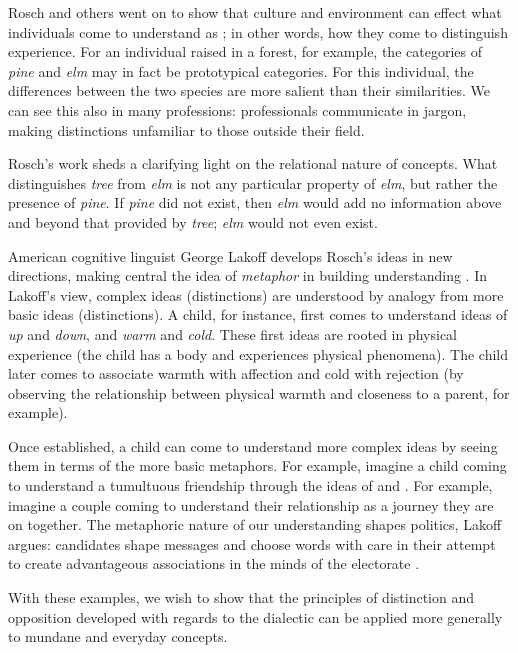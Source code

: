 \documentclass[12pt]{book}
\begin{document}
Rosch and others went on to show that culture and environment can effect what individuals come to understand as ; in other words, how they come to distinguish experience.
For an individual raised in a forest, for example, the categories of \textit{pine} and \textit{elm} may in fact be prototypical categories.
For this individual, the differences between the two species are more salient than their similarities.
We can see this also in many professions: professionals communicate in jargon, making distinctions unfamiliar to those outside their field.

Rosch's work sheds a clarifying light on the relational nature of concepts.
What distinguishes \textit{tree} from \textit{elm} is not any particular property of \textit{elm}, but rather the presence of \textit{pine}.
If \textit{pine} did not exist, then \textit{elm} would add no information above and beyond that provided by \textit{tree}; \textit{elm} would not even exist.

American cognitive linguist George Lakoff develops Rosch's ideas in new directions, making central the idea of \textit{metaphor} in building understanding \cite{lakoff03}.
In Lakoff's view, complex ideas (distinctions) are understood by analogy from more basic ideas (distinctions).
A child, for instance, first comes to understand ideas of \textit{up} and \textit{down}, and \textit{warm} and \textit{cold}.
These first ideas are rooted in physical experience (the child has a body and experiences physical phenomena).
The child later comes to associate warmth with affection and cold with rejection (by observing the relationship between physical warmth and closeness to a parent, for example).

Once established, a child can come to understand more complex ideas by seeing them in terms of the more basic metaphors.
For example, imagine a child coming to understand a tumultuous friendship through the ideas of  and .
For example, imagine a couple coming to understand their relationship as a journey they are on together.
The metaphoric nature of our understanding shapes politics, Lakoff argues: candidates shape messages and choose words with care in their attempt to create advantageous associations in the minds of the electorate \cite{lakoff14}.

With these examples, we wish to show that the principles of distinction and opposition developed with regards to the dialectic can be applied more generally to mundane and everyday concepts.
\end{document}
